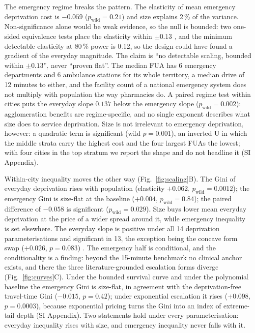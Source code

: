 \documentclass[9pt,twocolumn]{article}
\newcommand{\pw}[1]{$p_{\mathrm{wild}} = #1$}
\begin{document}
The emergency regime breaks the pattern. The elasticity of mean emergency
deprivation cost is $-0.059$ (\pw{0.21}) and size explains 2\,\% of the
variance. Non-significance alone would be weak evidence, so the null is
bounded: two one-sided equivalence tests place the elasticity within
$\pm 0.13$ \citep{lakens2017equivalence}, and the minimum detectable
elasticity at 80\,\% power is 0.12, so the design could have found a
gradient of the everyday magnitude. The claim is ``no detectable scaling,
bounded within $\pm 0.13$'', never ``proven flat''. The median FUA has 6
emergency departments and 6 ambulance stations for its whole territory, a
median drive of 12 minutes to either, and the facility count of a
national emergency system does not multiply with population the way
pharmacies do. A paired regime test within cities puts the everyday slope
$0.137$ below the emergency slope (\pw{0.002}): agglomeration benefits
are regime-specific, and no single exponent describes what size does to
service deprivation. Size is not irrelevant to emergency deprivation,
however: a quadratic term is significant (wild $p = 0.001$), an inverted U
in which the middle strata carry the highest cost and the four largest
FUAs the lowest; with four cities in the top stratum we report the shape
and do not headline it (SI Appendix).

Within-city inequality moves the other way (Fig.~\ref{fig:scaling}B).
The Gini of everyday deprivation rises with population (elasticity
$+0.062$, \pw{0.0012}); the emergency Gini is size-flat at the baseline
($+0.004$, \pw{0.84}); the paired difference of $-0.058$ is significant
(\pw{0.029}). Size buys lower mean everyday deprivation at the price of a
wider spread around it, while emergency inequality is set elsewhere. The
everyday slope is positive under all 14 deprivation parameterisations and
significant in 13, the exception being the concave form swap ($+0.026$,
$p = 0.083$) \citep{simonsohn2020specification}. The emergency half is
conditional, and the conditionality is a finding: beyond the 15-minute
benchmark no clinical anchor exists, and there the three
literature-grounded escalation forms diverge (Fig.~\ref{fig:curves}C).
Under the bounded survival curve and under the polynomial baseline the
emergency Gini is size-flat, in agreement with the deprivation-free
travel-time Gini ($-0.015$, $p = 0.42$); under exponential escalation it
rises ($+0.098$, $p = 0.0003$), because exponential pricing turns the Gini
into an index of extreme-tail depth (SI Appendix). Two statements hold
under every parameterisation: everyday inequality rises with size, and
emergency inequality never falls with it.
\end{document}
